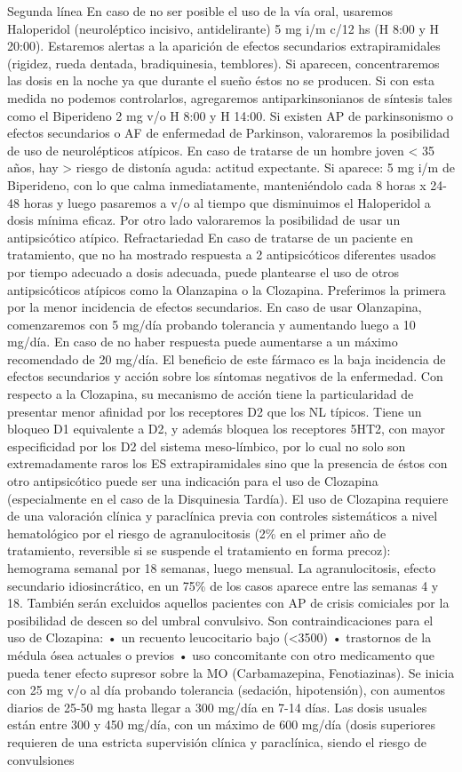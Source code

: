 Segunda línea En caso de no ser posible el uso de la vía oral, usaremos Haloperidol (neuroléptico incisivo, antidelirante) 5 mg i/m c/12 hs (H 8:00 y H 20:00). Estaremos alertas a la aparición de efectos secundarios extrapiramidales (rigidez, rueda dentada, bradiquinesia, temblores). Si aparecen, concentraremos las dosis en la noche ya que durante el sueño éstos no se producen. Si con esta medida no podemos controlarlos, agregaremos antiparkinsonianos de síntesis tales como el Biperideno 2 mg v/o H 8:00 y H 14:00. Si existen AP de parkinsonismo o efectos secundarios o AF de enfermedad de Parkinson, valoraremos la posibilidad de uso de neurolépticos atípicos. En caso de tratarse de un hombre joven < 35 años, hay > riesgo de distonía aguda: actitud expectante. Si aparece: 5 mg i/m de Biperideno, con lo que calma inmediatamente, manteniéndolo cada 8 horas x 24-48 horas y luego pasaremos a v/o al tiempo que disminuimos el Haloperidol a dosis mínima eficaz. Por otro lado valoraremos la posibilidad de usar un antipsicótico atípico. Refractariedad En caso de tratarse de un paciente en tratamiento, que no ha mostrado respuesta a 2 antipsicóticos diferentes usados por tiempo adecuado a dosis adecuada, puede plantearse el uso de otros antipsicóticos atípicos como la Olanzapina o la Clozapina. Preferimos la primera por la menor incidencia de efectos secundarios. En caso de usar Olanzapina, comenzaremos con 5 mg/día probando tolerancia y aumentando luego a 10 mg/día. En caso de no haber respuesta puede aumentarse a un máximo recomendado de 20 mg/día. El beneficio de este fármaco es la baja incidencia de efectos secundarios y acción sobre los síntomas negativos de la enfermedad. Con respecto a la Clozapina, su mecanismo de acción tiene la particularidad de presentar menor afinidad por los receptores D2 que los NL típicos. Tiene un bloqueo D1 equivalente a D2, y además bloquea los receptores 5HT2, con mayor especificidad por los D2 del sistema meso-límbico, por lo cual no solo son extremadamente raros los ES extrapiramidales sino que la presencia de éstos con otro antipsicótico puede ser una indicación para el uso de Clozapina (especialmente en el caso de la Disquinesia Tardía). El uso de Clozapina requiere de una valoración clínica y paraclínica previa con controles sistemáticos a nivel hematológico por el riesgo de agranulocitosis (2\% en el primer año de tratamiento, reversible si se suspende el tratamiento en forma precoz): hemograma semanal por 18 semanas, luego mensual. La agranulocitosis, efecto secundario idiosincrático, en un 75\% de los casos aparece entre las semanas 4 y 18. También serán excluidos aquellos pacientes con AP de crisis comiciales por la posibilidad de descen so del umbral convulsivo. Son contraindicaciones para el uso de Clozapina: • un recuento leucocitario bajo (<3500) • trastornos de la médula ósea actuales o previos • uso concomitante con otro medicamento que pueda tener efecto supresor sobre la MO (Carbamazepina, Fenotiazinas). Se inicia con 25 mg v/o al día probando tolerancia (sedación, hipotensión), con aumentos diarios de 25-50 mg hasta llegar a 300 mg/día en 7-14 días. Las dosis usuales están entre 300 y 450 mg/día, con un máximo de 600 mg/día (dosis superiores requieren de una estricta supervisión clínica y paraclínica, siendo el riesgo de convulsiones 